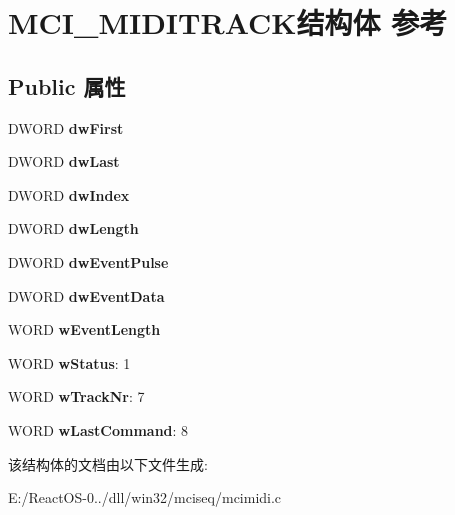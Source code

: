 \hypertarget{struct_m_c_i___m_i_d_i_t_r_a_c_k}{}\section{M\+C\+I\+\_\+\+M\+I\+D\+I\+T\+R\+A\+C\+K结构体 参考}
\label{struct_m_c_i___m_i_d_i_t_r_a_c_k}
\subsection*{Public 属性}
\begin{DoxyCompactItemize}
\item 
\mbox{\label{struct_m_c_i___m_i_d_i_t_r_a_c_k_a2f99bee36c2e0b080fba4dbdc97cae07}} 
D\+W\+O\+RD {\bfseries dw\+First}
\item 
\mbox{\label{struct_m_c_i___m_i_d_i_t_r_a_c_k_a1b8fcb9a51fb0abcb4e70b010ef87aaf}} 
D\+W\+O\+RD {\bfseries dw\+Last}
\item 
\mbox{\label{struct_m_c_i___m_i_d_i_t_r_a_c_k_a90d70b3aaf2eb82b3256e28b69be99cf}} 
D\+W\+O\+RD {\bfseries dw\+Index}
\item 
\mbox{\label{struct_m_c_i___m_i_d_i_t_r_a_c_k_ac175c5f68a9f92b320ea2645ab4159b9}} 
D\+W\+O\+RD {\bfseries dw\+Length}
\item 
\mbox{\label{struct_m_c_i___m_i_d_i_t_r_a_c_k_abb30dc5490fb3cdade76ff6d7398fa1c}} 
D\+W\+O\+RD {\bfseries dw\+Event\+Pulse}
\item 
\mbox{\label{struct_m_c_i___m_i_d_i_t_r_a_c_k_a8f9fb148f64ef0124d8c715ee43ab866}} 
D\+W\+O\+RD {\bfseries dw\+Event\+Data}
\item 
\mbox{\label{struct_m_c_i___m_i_d_i_t_r_a_c_k_addbf60e8b26253e41b551bfe1b1e1a20}} 
W\+O\+RD {\bfseries w\+Event\+Length}
\item 
\mbox{\label{struct_m_c_i___m_i_d_i_t_r_a_c_k_adc139778c35d7bc65a3a361e57cb1d6e}} 
W\+O\+RD {\bfseries w\+Status}\+: 1
\item 
\mbox{\label{struct_m_c_i___m_i_d_i_t_r_a_c_k_a3a2ca22a03a344e5b4dfa59ad2d939bf}} 
W\+O\+RD {\bfseries w\+Track\+Nr}\+: 7
\item 
\mbox{\label{struct_m_c_i___m_i_d_i_t_r_a_c_k_a45dbc05f0786b28d9d42d5818e546e58}} 
W\+O\+RD {\bfseries w\+Last\+Command}\+: 8
\end{DoxyCompactItemize}


该结构体的文档由以下文件生成\+:\begin{DoxyCompactItemize}
\item 
E\+:/\+React\+O\+S-\/0../dll/win32/mciseq/mcimidi.\+c\end{DoxyCompactItemize}

